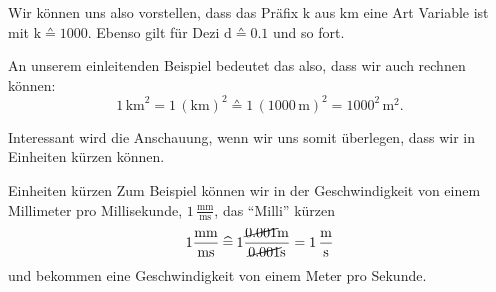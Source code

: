 \documentclass[../../main.tex]{subfiles}
\begin{document}
    Wir können uns also vorstellen, dass das Präfix $\text{k}$ aus $\text{km}$ eine Art Variable ist mit
    $\text{k} \corresponds 1000$. Ebenso gilt für Dezi $\text{d} \corresponds 0.1$ und so fort.

    \begin{example}{}
        An unserem einleitenden Beispiel bedeutet das also, dass wir auch rechnen können:
        \[1\,\text{km}^2 = 1\,(\text{km})^2 \corresponds 1\,(1000\,\text{m})^2 = 1000^2\,\text{m}^2.\]
    \end{example}

    Interessant wird die Anschauung, wenn wir uns somit überlegen, dass wir in Einheiten kürzen können.

    \begin{example}{Einheiten kürzen}
        Zum Beispiel können wir in der Geschwindigkeit von einem Millimeter pro Millisekunde,
        $1\,\frac{\text{mm}}{\text{ms}}$, das \enquote{Milli} kürzen
        \[
            1\frac{\text{mm}}{\text{ms}} \mathbin{\widehat{=}} 1\frac{\cancel{0.001}\text{m}}{\cancel{0.001}\text{s}}
            = 1\,\frac{\text{m}}{\text{s}}
        \]
        und bekommen eine Geschwindigkeit von einem Meter pro Sekunde.        
    \end{example}
\end{document}
